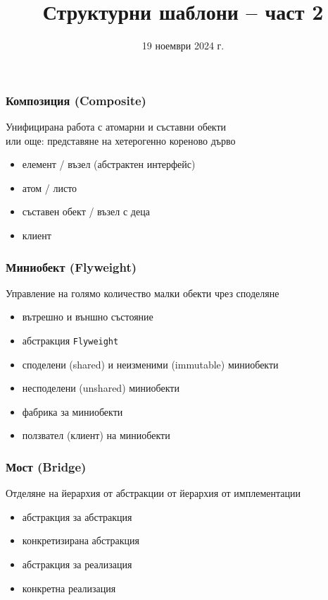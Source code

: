 \documentclass[alsotrans]{beamerswitch}
\title{Структурни шаблони -- част 2}
\date{19 ноември 2024 г.}
\begin{document}
\begin{frame}
  \titlepage
\end{frame}

\begin{frame}
  \frametitle{Композиция (Composite)}

  \begin{purpose}
    Унифицирана работа с атомарни и съставни обекти\\
    \pause или още: представяне на хетерогенно кореново дърво
  \end{purpose}

  \pause
  \vspace{2ex}

  \comps
  \begin{itemize}[<+->]
  \item елемент / възел (абстрактен интерфейс)
  \item атом / листо
  \item съставен обект / възел с деца
  \item клиент
  \end{itemize}
\end{frame}

\begin{frame}
  \frametitle{Миниобект (Flyweight)}

  \begin{purpose}
    Управление на голямо количество малки обекти чрез споделяне
  \end{purpose}

  \pause
  \vspace{2ex}
  \comps
  \begin{itemize}[<+->]
  \item вътрешно и външно състояние
  \item абстракция \tt{Flyweight}
  \item споделени (shared) и неизменими (immutable) миниобекти
  \item несподелени (unshared) миниобекти
  \item фабрика за миниобекти
  \item ползвател (клиент) на миниобекти
  \end{itemize}
\end{frame}

\begin{frame}
  \frametitle{Мост (Bridge)}

  \begin{purpose}
    Отделяне на йерархия от абстракции от йерархия от имплементации
  \end{purpose}

  \pause
  \vspace{2ex}
  \comps
  \begin{itemize}[<+->]
  \item абстракция за абстракция
  \item конкретизирана абстракция
  \item абстракция за реализация
  \item конкретна реализация
  \end{itemize}
\end{frame}
\end{document}
